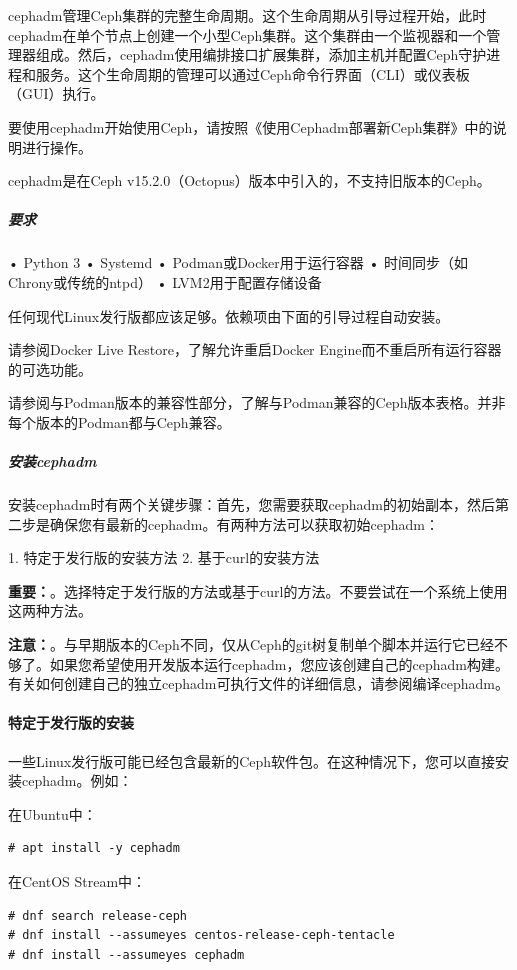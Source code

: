 \documentclass[12pt,UTF8]{ctexbook}
\begin{document}
cephadm管理Ceph集群的完整生命周期。这个生命周期从引导过程开始，此时cephadm在单个节点上创建一个小型Ceph集群。这个集群由一个监视器和一个管理器组成。然后，cephadm使用编排接口扩展集群，添加主机并配置Ceph守护进程和服务。这个生命周期的管理可以通过Ceph命令行界面（CLI）或仪表板（GUI）执行。

要使用cephadm开始使用Ceph，请按照《使用Cephadm部署新Ceph集群》中的说明进行操作。

cephadm是在Ceph v15.2.0（Octopus）版本中引入的，不支持旧版本的Ceph。

\subparagraph{要求}

• Python 3
• Systemd
• Podman或Docker用于运行容器
• 时间同步（如Chrony或传统的ntpd）
• LVM2用于配置存储设备

任何现代Linux发行版都应该足够。依赖项由下面的引导过程自动安装。

请参阅Docker Live Restore，了解允许重启Docker Engine而不重启所有运行容器的可选功能。

请参阅与Podman版本的兼容性部分，了解与Podman兼容的Ceph版本表格。并非每个版本的Podman都与Ceph兼容。

\subparagraph{安装cephadm}

安装cephadm时有两个关键步骤：首先，您需要获取cephadm的初始副本，然后第二步是确保您有最新的cephadm。有两种方法可以获取初始cephadm：

1. 特定于发行版的安装方法
2. 基于curl的安装方法

\textbf{重要：}。选择特定于发行版的方法或基于curl的方法。不要尝试在一个系统上使用这两种方法。

\textbf{注意：}。与早期版本的Ceph不同，仅从Ceph的git树复制单个脚本并运行它已经不够了。如果您希望使用开发版本运行cephadm，您应该创建自己的cephadm构建。有关如何创建自己的独立cephadm可执行文件的详细信息，请参阅编译cephadm。

\paragraph{特定于发行版的安装}

一些Linux发行版可能已经包含最新的Ceph软件包。在这种情况下，您可以直接安装cephadm。例如：

在Ubuntu中：
\begin{verbatim}
# apt install -y cephadm
\end{verbatim}

在CentOS Stream中：
\begin{verbatim}
# dnf search release-ceph
# dnf install --assumeyes centos-release-ceph-tentacle
# dnf install --assumeyes cephadm
\end{verbatim}
\end{document}
